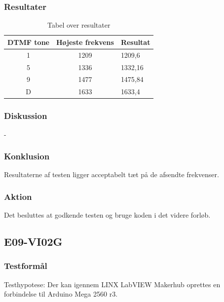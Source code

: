 			
		\subsubsection{Resultater}
		
			\begin{table}[]
				\centering
				\caption{Tabel over resultater}
				\label{SWhelmholtzresultater}
				\begin{tabular}{lll}
					\multicolumn{1}{l|}{\textbf{DTMF tone}} & 	
					\multicolumn{1}{l|}{\textbf{Højeste frekvens}} & \textbf{Resultat} \\ \hline
					\multicolumn{1}{c|}{1}& 
					\multicolumn{1}{c|}{1209}&1209,6\\
					\multicolumn{1}{c|}{5}& 
					\multicolumn{1}{c|}{1336}&1332,16\\
					\multicolumn{1}{c|}{9}& 
					\multicolumn{1}{c|}{1477}&1475,84\\
					\multicolumn{1}{c|}{D}& 
					\multicolumn{1}{c|}{1633}&1633,4\\
                   
				\end{tabular}
			\end{table}
	
		\subsubsection{Diskussion} 
		
		-
	
		\subsubsection{Konklusion}
		 
	Resultaterne af testen ligger acceptabelt tæt på de afsendte frekvenser. 
	
	    \subsubsection{Aktion}
	    Det besluttes at godkende testen og bruge koden i det videre forløb. 

\subsection{E09-VI02G}
\subsubsection{Testformål} 
Testhypotese: Der kan igennem LINX LabVIEW Makerhub oprettes en forbindelse til Arduino Mega 2560 r3. 
